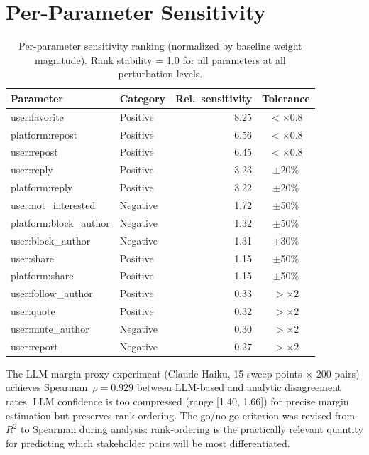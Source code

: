 \documentclass[11pt,letterpaper]{article}
\begin{document}
\section{Per-Parameter Sensitivity}
\label{app:sensitivity}

\begin{table}[H]
\caption{Per-parameter sensitivity ranking (normalized by baseline weight magnitude). Rank stability = 1.0 for all parameters at all perturbation levels.}
\label{tab:per-param}
\centering\small
\begin{tabular}{llrc}
\toprule
Parameter & Category & Rel.\ sensitivity & Tolerance \\
\midrule
user:favorite & Positive & 8.25 & $< \times 0.8$ \\
platform:repost & Positive & 6.56 & $< \times 0.8$ \\
user:repost & Positive & 6.45 & $< \times 0.8$ \\
user:reply & Positive & 3.23 & $\pm$20\% \\
platform:reply & Positive & 3.22 & $\pm$20\% \\
user:not\_interested & Negative & 1.72 & $\pm$50\% \\
platform:block\_author & Negative & 1.32 & $\pm$50\% \\
user:block\_author & Negative & 1.31 & $\pm$30\% \\
user:share & Positive & 1.15 & $\pm$50\% \\
platform:share & Positive & 1.15 & $\pm$50\% \\
user:follow\_author & Positive & 0.33 & $> \times 2$ \\
user:quote & Positive & 0.32 & $> \times 2$ \\
user:mute\_author & Negative & 0.30 & $> \times 2$ \\
user:report & Negative & 0.27 & $> \times 2$ \\
\bottomrule
\end{tabular}
\end{table}

The LLM margin proxy experiment (Claude Haiku, 15 sweep points
$\times$ 200 pairs) achieves Spearman~$\rho = 0.929$ between LLM-based
and analytic disagreement rates. LLM confidence is too compressed
(range [1.40, 1.66]) for precise margin estimation but preserves
rank-ordering. The go/no-go criterion was revised from $R^2$ to
Spearman during analysis: rank-ordering is the practically relevant
quantity for predicting which stakeholder pairs will be most
differentiated.
\end{document}
